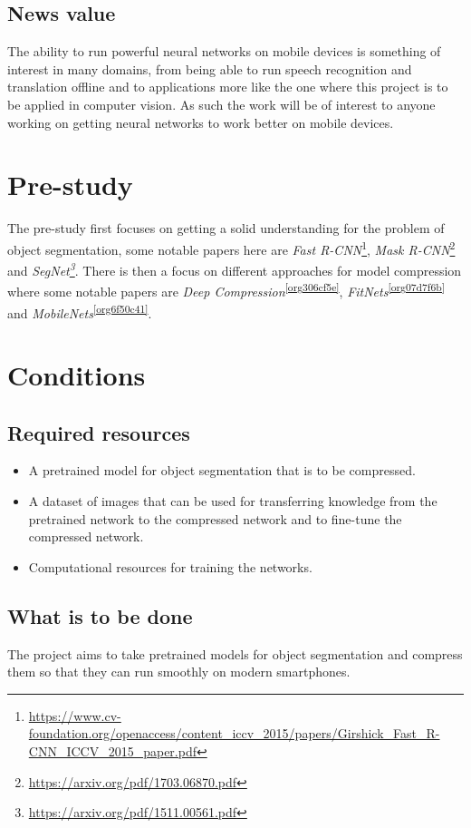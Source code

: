\documentclass[11pt]{article}
\begin{document}
\subsection{News value}
\label{sec:orgb8732a2}
The ability to run powerful neural networks on mobile devices is something of interest in many domains, from being able to run speech recognition and translation offline and to applications more like the one where this project is to be applied in computer vision. As such the work will be of interest to anyone working on getting neural networks to work better on mobile devices.

\section{Pre-study}
\label{sec:orgb0c87a4}
The pre-study first focuses on getting a solid understanding for the problem of object segmentation, some notable papers here are \emph{Fast R-CNN}\footnote{\url{https://www.cv-foundation.org/openaccess/content\_iccv\_2015/papers/Girshick\_Fast\_R-CNN\_ICCV\_2015\_paper.pdf}}, \emph{Mask R-CNN}\footnote{\url{https://arxiv.org/pdf/1703.06870.pdf}} and \emph{SegNet\footnote{\url{https://arxiv.org/pdf/1511.00561.pdf}}}.
There is then a focus on different approaches for model compression where some notable papers are \emph{Deep Compression}\textsuperscript{\ref{org306cf5e}}, \emph{FitNets}\textsuperscript{\ref{org07d7f6b}} and \emph{MobileNets}\textsuperscript{\ref{org6f50c41}}. 

\section{Conditions}
\label{sec:org1fa6ef1}
\subsection{Required resources}
\label{sec:orgc5305fa}
\begin{itemize}
\item A pretrained model for object segmentation that is to be compressed.
\item A dataset of images that can be used for transferring knowledge from the pretrained network to the compressed network and to fine-tune the compressed network.
\item Computational resources for training the networks.
\end{itemize}
\subsection{What is to be done}
\label{sec:org3e8e548}
The project aims to take pretrained models for object segmentation and compress them so that they can run smoothly on modern smartphones.
\end{document}
